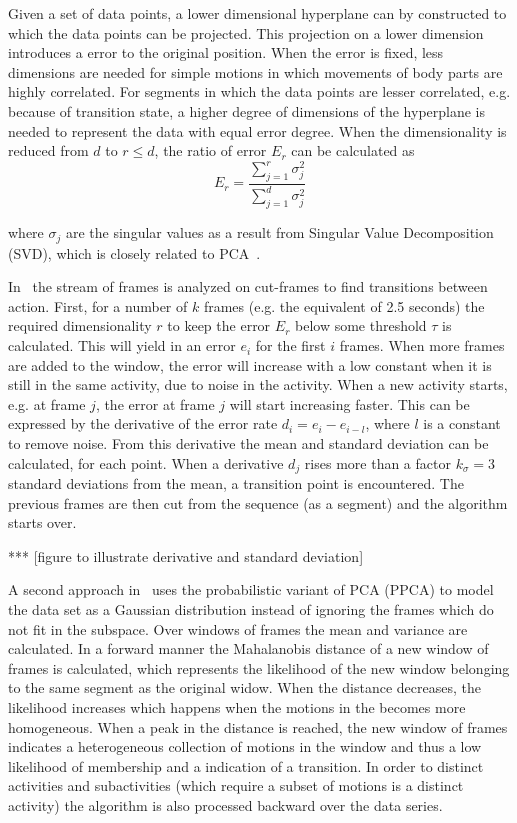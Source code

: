 Given a set of data points, a lower dimensional hyperplane can by constructed to which the data points can be projected.
This projection on a lower dimension introduces a error to the original position.
When the error is fixed, less dimensions are needed for simple motions in which movements of body parts are highly correlated.
For segments in which the data points are lesser correlated, e.g. because of transition state, a higher degree of dimensions of the hyperplane is needed to represent the data with equal error degree.
When the dimensionality is reduced from $d$ to $r \le d$, the ratio of error $E_r$ can be calculated as
\begin{equation}
	E_r = \frac{\sum_{j=1}^{r} \sigma_j^2}{\sum_{j=1}^{d} \sigma_j^2}
\end{equation}

where $\sigma_j$ are the singular values as a result from Singular Value Decomposition (SVD), which is closely related to PCA~\cite{shlens2005tutorial}.

In~\cite{barbivc2004segmenting} the stream of frames is analyzed on cut-frames to find transitions between action.
First, for a number of $k$ frames (e.g. the equivalent of 2.5 seconds) the required dimensionality $r$ to keep the error $E_r$ below some threshold $\tau$ is calculated.
This will yield in an error $e_i$ for the first $i$ frames.
When more frames are added to the window, the error will increase with a low constant when it is still in the same activity, due to noise in the activity.
When a new activity starts, e.g. at frame $j$, the error at frame $j$ will start increasing faster.
This can be expressed by the derivative of the error rate $d_i = e_i - e_{i-l}$, where $l$ is a constant to remove noise.
From this derivative the mean and standard deviation can be calculated, for each point.
When a derivative $d_j$ rises more than a factor $k_\sigma = 3$ standard deviations from the mean, a transition point is encountered.
The previous frames are then cut from the sequence (as a segment) and the algorithm starts over.

*** [figure to illustrate derivative and standard deviation]

A second approach in~\cite{barbivc2004segmenting} uses the probabilistic variant of PCA (PPCA) to model the data set as a Gaussian distribution instead of ignoring the frames which do not fit in the subspace.
Over windows of frames the mean and variance are calculated.
In a forward manner the Mahalanobis distance of a new window of frames is calculated, which represents the likelihood of the new window belonging to the same segment as the original widow.
When the distance decreases, the likelihood increases which happens when the motions in the becomes more homogeneous.
When a peak in the distance is reached, the new window of frames indicates a heterogeneous collection of motions in the window and thus a low likelihood of membership and a indication of a transition.
In order to distinct activities and subactivities (which require a subset of motions is a distinct activity) the algorithm is also processed backward over the data series.

